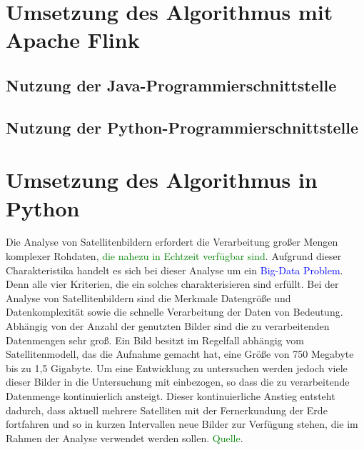 \section{Umsetzung des Algorithmus mit Apache Flink}
\subsection{Nutzung der Java-Programmierschnittstelle}
\subsection{Nutzung der Python-Programmierschnittstelle}
\section{Umsetzung des Algorithmus in Python}
Die Analyse von Satellitenbildern erfordert die Verarbeitung großer Mengen komplexer Rohdaten, \textcolor{green}{die nahezu in Echtzeit verfügbar sind}. Aufgrund dieser Charakteristika handelt es sich bei dieser Analyse um ein \textcolor{blue}{Big-Data Problem}. Denn alle vier Kriterien, die ein solches charakterisieren sind erfüllt.
\newline
Bei der Analyse von Satellitenbildern sind die Merkmale Datengröße und Datenkomplexität sowie die schnelle Verarbeitung der Daten von Bedeutung. Abhängig von der Anzahl der genutzten Bilder sind die zu verarbeitenden Datenmengen sehr groß. Ein Bild besitzt im Regelfall abhängig vom Satellitenmodell, das die Aufnahme gemacht hat, eine Größe von 750 Megabyte bis zu 1,5 Gigabyte. Um eine Entwicklung zu untersuchen werden jedoch viele dieser Bilder in die Untersuchung mit einbezogen, so dass die zu verarbeitende Datenmenge kontinuierlich ansteigt. Dieser kontinuierliche Anstieg entsteht dadurch, dass aktuell mehrere Satelliten mit der Fernerkundung der Erde fortfahren und so in kurzen Intervallen neue Bilder zur Verfügung stehen, die im Rahmen der Analyse verwendet werden sollen. \textcolor{green}{Quelle}.



